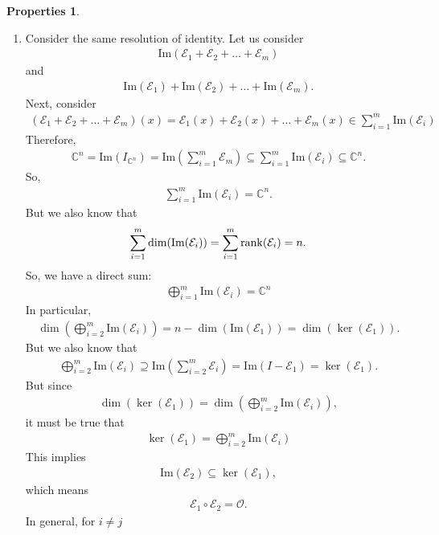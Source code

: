 \documentclass{book}
\theoremstyle{definition}
\newtheorem{prop}{Properties}[section]
\newcommand{\E}{\mathcal{E}}
\newcommand{\ima}{\text{Im}}
\begin{document}
\begin{prop}
\begin{enumerate}
	\item Consider the same resolution of identity. Let us consider 
	\begin{align*}
	\ima(\E_1 + \E_2 + \dots + \E_m)
	\end{align*}
	and
	\begin{align*}
	\ima(\E_1) + \ima(\E_2) + \dots + \ima(\E_m).
	\end{align*}
	Next, consider
	\begin{align*}
	(\E_1 + \E_2 + \dots + \E_m)(x) = \E_1(x) + \E_2(x) + \dots + \E_m(x) \in \sum^m_{i=1}\ima(\E_i)
	\end{align*}
	Therefore,
	\begin{align*}
	\mathbb{C}^n = \ima(I_{\mathbb{C}^n}) = \ima\left( \sum^m_{i=1}\E_m \right) \subseteq \sum^m_{i=1}\ima(\E_i) \subseteq \mathbb{C}^n.
	\end{align*}
	So,
	\begin{align*}
	\sum^m_{i=1}\ima(\E_i) = \mathbb{C}^n.
	\end{align*}
	But we also know that
	\begin{align*}
	\sum^m_{i=1}\dim(\ima(\E_i)) = \sum^m_{i=1}\rank(\E_i) = n.
	\end{align*}
	So, we have a direct sum:
	\begin{align*}
	\boxed{\bigoplus^m_{i=1} \ima(\E_i) = \mathbb{C}^n}
	\end{align*}
	In particular,
	\begin{align*}
	\dim\left( \bigoplus^m_{i=2} \ima(\E_i)  \right) = n - \dim(\ima(\E_1)) = \dim(\ker(\E_1)).
	\end{align*}
	But we also know that 
	\begin{align*}
	\bigoplus^m_{i=2} \ima(\E_i) \supseteq \ima \left( \sum^m_{i=2}\E_i \right) = \ima(I - \E_1) = \ker(\E_1).
	\end{align*}
	But since
	\begin{align*}
	\dim(\ker(\E_1)) = \dim\left( \bigoplus^m_{i=2} \ima(\E_i)  \right), 
	\end{align*}
	it must be true that
	\begin{align*}
	\boxed{\ker(\E_1) = \bigoplus^m_{i=2} \ima(\E_i)}
	\end{align*}
	This implies
	\begin{align*}
	\ima(\E_2) \subseteq \ker(\E_1),
	\end{align*}
	which means
	\begin{align*}
	\E_1 \circ \E_2 = \mathcal{O}.
	\end{align*}
	In general, for $i \neq j$

\end{enumerate}
\end{prop}
\end{document}
